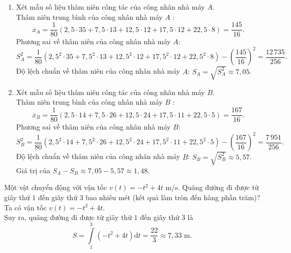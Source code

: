 \begin{bt}
{		\begin{enumerate}[$\bullet$]
			\item Xét mẫu số liệu thâm niên công tác của công nhân nhà máy $A$.\\
			Thâm niên trung bình của công nhân nhà máy $A$ :
			$$\overline{x}_A=\dfrac{1}{80}\left(2{,}5\cdot 35+7{,}5\cdot 13+12{,}5\cdot 12+17{,}5\cdot 12+22{,}5\cdot8\right)=\dfrac{145}{16}.$$
			Phương sai về thâm niên của công nhân nhà máy $A$: $$S_A^2=\dfrac{1}{80}\left(2{,}5^2\cdot 35+7{,}5^2\cdot 13+12{,}5^2\cdot 12+17{,}5^2\cdot 12+22{,}5^2\cdot8\right)-\left(\dfrac{145}{16}\right)^2 =\dfrac{12\,735}{256}.$$
			Độ lệch chuẩn  về thâm niên của công nhân nhà máy $A$: $S_A=\sqrt{S_A^2}\approx 7{,}05$.
			\item Xét mẫu số liệu thâm niên công tác của công nhân nhà máy $B$.\\
			Thâm niên trung bình của công nhân nhà máy $B$ :
			$$\overline{x}_B=\dfrac{1}{80}\left(2{,}5\cdot 14+7{,}5\cdot 26+12{,}5\cdot 24+17{,}5\cdot 11+22{,}5\cdot5\right)=\dfrac{167}{16}.$$
			Phương sai về thâm niên của công nhân nhà máy $B$: $$S_B^2=\dfrac{1}{80}\left(2{,}5^2\cdot 14+7{,}5^2\cdot 26+12{,}5^2\cdot 24+17{,}5^2\cdot 11+22{,}5^2\cdot 5\right)-\left(\dfrac{167}{16}\right)^2 =\dfrac{7\,951}{256}.$$
			Độ lệch chuẩn  về thâm niên của công nhân nhà máy $B$: $S_B=\sqrt{S_B^2}\approx 5{,}57$.\\
			Giá trị của $S_A-S_B\approx 7{,}05-5{,}57\approx 1{,}48$.
		\end{enumerate}
	}
\end{bt}

\begin{bt}%

	Một vật chuyển động với vận tốc $v(t) = -t^2 + 4t$ m/s. Quãng đường đi được từ giây thứ $1$ đến giây thứ $3$ bao nhiêu mét (kết quả làm tròn đến hàng phần trăm)?
	\loigiai
	{
		Ta có vận tốc $v(t) = -t^2 + 4t$.\\
		Suy ra, quãng đường đi được từ giây thứ $1$ đến giây thứ $3$ là
		$$S = \displaystyle \int\limits_{1}^{3} \left(-t^2 + 4t\right) \mathrm{d}t = \dfrac{22}{3} \approx 7{,}33 \text{ m}.$$
	}
\end{bt}

